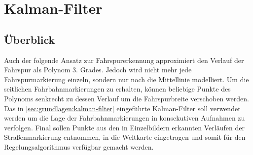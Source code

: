 \section{Kalman-Filter \dcsecondauthorshort}
\label{sec:fahrspurerkennung_kalman}

\subsection{Überblick} \label{ssec:fahrspurerkennung:kalman-filter:ueberblick}
Auch der folgende Ansatz zur Fahrspurerkennung approximiert den Verlauf der Fahrspur als Polynom 3. Grades. Jedoch wird nicht mehr jede Fahrspurmarkierung einzeln, sondern nur noch die Mittellinie modelliert. Um die seitlichen Fahrbahnmarkierungen zu erhalten, können beliebige Punkte des Polynoms senkrecht zu dessen Verlauf um die Fahrspurbreite verschoben werden.
Das in \ref{sec:grundlagen:kalman-filter} eingeführte Kalman-Filter soll verwendet werden um die Lage der Fahrbahnmarkierungen in konsekutiven Aufnahmen zu verfolgen. Final sollen Punkte aus den in Einzelbildern erkannten Verläufen der Straßenmarkierung entnommen, in die Weltkarte eingetragen und somit für den Regelungsalgorithmus verfügbar gemacht werden.

